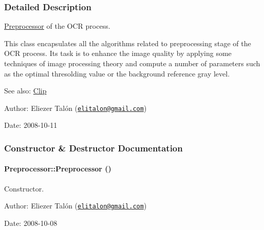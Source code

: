 \subsubsection{Detailed Description}
\hyperlink{class_preprocessor}{Preprocessor} of the OCR process. 

This class encapsulates all the algorithms related to preprocessing stage of the OCR process. Its task is to enhance the image quality by applying some techniques of image processing theory and compute a number of parameters such as the optimal thresolding value or the background reference gray level.

\begin{Desc}
\item[See also:]\hyperlink{class_clip}{Clip}\end{Desc}
\begin{Desc}
\item[Author:]Eliezer Talón (\href{mailto:elitalon@gmail.com}{\tt elitalon@gmail.com}) \end{Desc}
\begin{Desc}
\item[Date:]2008-10-11 \end{Desc}


\subsubsection{Constructor \& Destructor Documentation}
\hypertarget{class_preprocessor_da966c8b83e7c3bcd8759549c3cdf688}{
\paragraph[{Preprocessor}]{\setlength{\rightskip}{0pt plus 5cm}Preprocessor::Preprocessor ()}\hfill}
\label{class_preprocessor_da966c8b83e7c3bcd8759549c3cdf688}


Constructor. 

\begin{Desc}
\item[Author:]Eliezer Talón (\href{mailto:elitalon@gmail.com}{\tt elitalon@gmail.com}) \end{Desc}
\begin{Desc}
\item[Date:]2008-10-08 \end{Desc}


